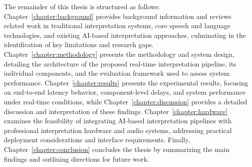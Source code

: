 The remainder of this thesis is structured as follows: 
Chapter~\ref{chapter:background} provides background information and reviews related work in traditional interpretation systems, core speech and language technologies, and existing AI-based interpretation approaches, culminating in the identification of key limitations and research gaps. 
Chapter~\ref{chapter:methodology} presents the methodology and system design, detailing the architecture of the proposed real-time interpretation pipeline, its individual components, and the evaluation framework used to assess system performance. 
Chapter~\ref{chapter:results} presents the experimental results, focusing on end-to-end latency behavior, component-level delays, and system performance under real-time conditions, while Chapter~\ref{chapter:discussion} provides a detailed discussion and interpretation of these findings.
Chapter~\ref{chapter:hardware} examines the feasibility of integrating AI-based interpretation pipelines with professional interpretation hardware and audio systems, addressing practical deployment considerations and interface requirements. 
Finally, Chapter~\ref{chapter:conclusion} concludes the thesis by summarizing the main findings and outlining directions for future work.
